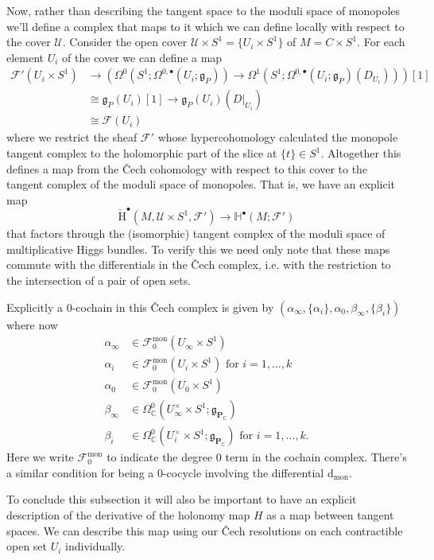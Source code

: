 \documentclass[11pt, oneside, reqno]{amsart}
\theoremstyle{definition} \newtheorem{definition}{Definition}[section]
\theoremstyle{definition} \newtheorem{remark}[definition]{Remark}
\theoremstyle{definition} \newtheorem{remarks}[definition]{Remarks}
\theoremstyle{definition} \newtheorem{question}[definition]{Question}
\theoremstyle{definition} \newtheorem*{note}{Note}
\theoremstyle{definition} \newtheorem{example}[definition]{Example}
\theoremstyle{definition} \newtheorem{examples}[definition]{Examples}
\renewcommand{\gg}{\mathfrak{g}}
\newcommand{\bb}[1]{\mathbb{#1}}
\newcommand{\mr}[1]{\mathrm{#1}}
\newcommand{\mc}[1]{\mathcal{#1}}
\newcommand{\bo}[1]{\boldsymbol{#1}}
\newcommand{\CC}{\mathbb{C}}
\newcommand{\iso}{\cong}
\renewcommand{\d}{\mathrm{d}}
\begin{document}
Now, rather than describing the tangent space to the moduli space of monopoles we'll define a complex that maps to it which we can define locally with respect to the cover $\mc U$.  Consider the open cover $\mc U \times S^1 = \{U_i \times S^1\}$ of $M = C \times S^1$.  For each element $U_i$ of the cover we can define a map
\begin{align*}
\mc F'(U_i \times S^1) &\to (\Omega^0(S^1; \Omega^{0,\bullet}(U_i; \gg_P)) \to \Omega^1(S^1; \Omega^{0,\bullet}(U_i; \gg_P)(D_{U_i})))[1] \\ 
&\iso \gg_P(U_i)[1] \to \gg_P(U_i)(D|_{U_i}) \\
&\iso \mc F(U_i)
\end{align*}
where we restrict the sheaf $\mc F'$ whose hypercohomology calculated the monopole tangent complex to the holomorphic part of the slice at $\{t\} \in S^1$.  Altogether this defines a map from the \v Cech cohomology with respect to this cover to the tangent complex of the moduli space of monopoles.  That is, we have an explicit map
\[{\mr {\check H}}^\bullet(M, \mc U \times S^1, \mc F') \to \bb H^\bullet(M; \mc F')\]
that factors through the (isomorphic) tangent complex of the moduli space of multiplicative Higgs bundles.  To verify this we need only note that these maps commute with the differentials in the \v Cech complex, i.e. with the restriction to the intersection of a pair of open sets. 

Explicitly a 0-cochain in this \v Cech complex is given by $(\alpha_\infty, \{\alpha_i\}, \alpha_0, \beta_\infty, \{\beta_i\})$ where now 
\begin{align*}
 \alpha_\infty &\in \mc F^{\mr{mon}}_0(U_\infty \times S^1) \\
 \alpha_i &\in \mc F^{\mr{mon}}_0(U_i\times S^1) \text{ for } i = 1,\ldots,k \\
 \alpha_0 &\in \mc F^{\mr{mon}}_0(U_0\times S^1) \\
 \beta_\infty &\in \Omega^0_\CC(U_\infty^\times \times S^1; \gg_{\bo P_\CC}) \\
 \beta_i &\in \Omega^0_\CC(U_i^\times \times S^1; \gg_{\bo P_\CC}) \text{ for } i=1,\ldots,k.
\end{align*}
Here we write $\mc F^{\mr{mon}}_0$ to indicate the degree 0 term in the cochain complex.  There's a similar condition for being a 0-cocycle involving the differential $\d_{\mr{mon}}$. 

To conclude this subsection it will also be important to have an explicit description of the derivative of the holonomy map $H$ as a map between tangent spaces.  We can describe this map using our \v Cech resolutions on each contractible open set $U_i$ individually.
\end{document}
